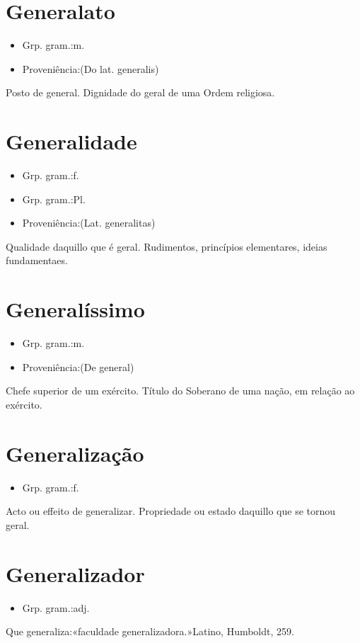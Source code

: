 \section{Generalato}
\begin{itemize}
\item {Grp. gram.:m.}
\end{itemize}
\begin{itemize}
\item {Proveniência:(Do lat. \textunderscore generalis\textunderscore )}
\end{itemize}
Posto de general.
Dignidade do geral de uma Ordem religiosa.
\section{Generalidade}
\begin{itemize}
\item {Grp. gram.:f.}
\end{itemize}
\begin{itemize}
\item {Grp. gram.:Pl.}
\end{itemize}
\begin{itemize}
\item {Proveniência:(Lat. \textunderscore generalitas\textunderscore )}
\end{itemize}
Qualidade daquillo que é geral.
Rudimentos, princípios elementares, ideias fundamentaes.
\section{Generalíssimo}
\begin{itemize}
\item {Grp. gram.:m.}
\end{itemize}
\begin{itemize}
\item {Proveniência:(De \textunderscore general\textunderscore )}
\end{itemize}
Chefe superior de um exército.
Título do Soberano de uma nação, em relação ao exército.
\section{Generalização}
\begin{itemize}
\item {Grp. gram.:f.}
\end{itemize}
Acto ou effeito de generalizar.
Propriedade ou estado daquillo que se tornou geral.
\section{Generalizador}
\begin{itemize}
\item {Grp. gram.:adj.}
\end{itemize}
Que generaliza:«\textunderscore faculdade generalizadora.\textunderscore »Latino, \textunderscore Humboldt\textunderscore , 259.
